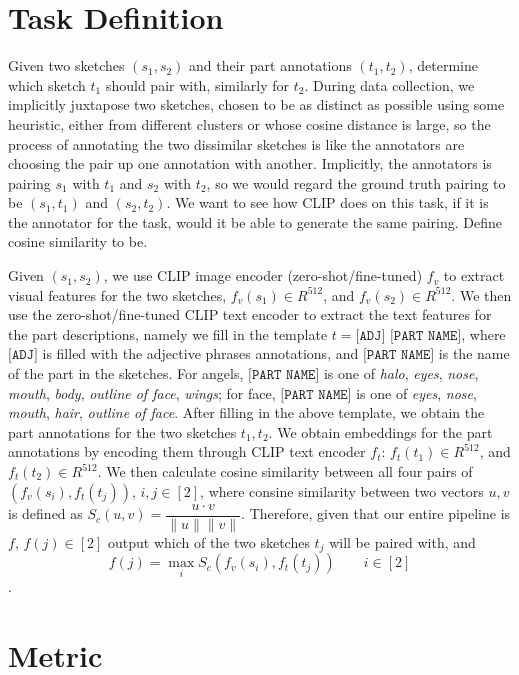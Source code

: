 \section{Task Definition}
Given two sketches $(s_1,s_2)$ and their part annotations $(t_1,t_2)$, determine which sketch $t_1$ should pair with, similarly for $t_2$. 
During data collection, we implicitly juxtapose two sketches, chosen to be as distinct as possible using some heuristic, either from different clusters or whose cosine distance is large, so the process of annotating the two dissimilar sketches is like the annotators are choosing the pair up one annotation with another. Implicitly, the annotators is pairing $s_1$ with $t_1$ and $s_2$ with $t_2$, so we would regard the ground truth pairing to be $(s_1,t_1)$ and $(s_2,t_2)$. We want to see how CLIP does on this task, if it is the annotator for the task, would it be able to generate the same pairing. Define cosine similarity to be.  

Given $(s_1,s_2)$, we use CLIP image encoder (zero-shot/fine-tuned) $f_v$ to extract visual features for the two sketches,  $f_v(s_1) \in {R}^{512}$, and $f_v(s_2) \in {R}^{512}$. We then use the zero-shot/fine-tuned CLIP text encoder to extract the text features for the part descriptions, namely we fill in the template $t = \texttt{[ADJ] [PART NAME]}$, where $\texttt{[ADJ]}$ is filled with the adjective phrases annotations, and $\texttt{[PART NAME]}$ is the name of the part in the sketches. For angels, $\texttt{[PART NAME]}$ is one of \textit{halo}, \textit{eyes}, \textit{nose}, \textit{mouth}, \textit{body}, \textit{outline of face}, \textit{wings}; for face, $\texttt{[PART NAME]}$ is one of \textit{eyes}, \textit{nose}, \textit{mouth}, \textit{hair}, \textit{outline of face}. After filling in the above template, we obtain the part annotations for the two sketches $t_1,t_2$.  
We obtain embeddings for the part annotations by encoding them through CLIP text encoder $f_t$: $f_t(t_1) \in {R}^{512}$, and $f_t(t_2) \in {R}^{512}$. We then calculate cosine similarity between all four pairs of $(f_v(s_i), f_t(t_j))$, $i,j \in [2]$, where consine similarity between two vectors $u,v$ is defined as $S_c(u,v) = \dfrac{u \cdot v}{\|u\| \|v\|}$. 
Therefore, given that our entire pipeline is $f$, $f(j) \in [2]$ output which of the two sketches $t_j$ will be paired with, and $$f(j) = \max_{i} S_c(f_v(s_i), f_t(t_j)) \hspace{2em} i \in [2]$$.    

\section{Metric}


